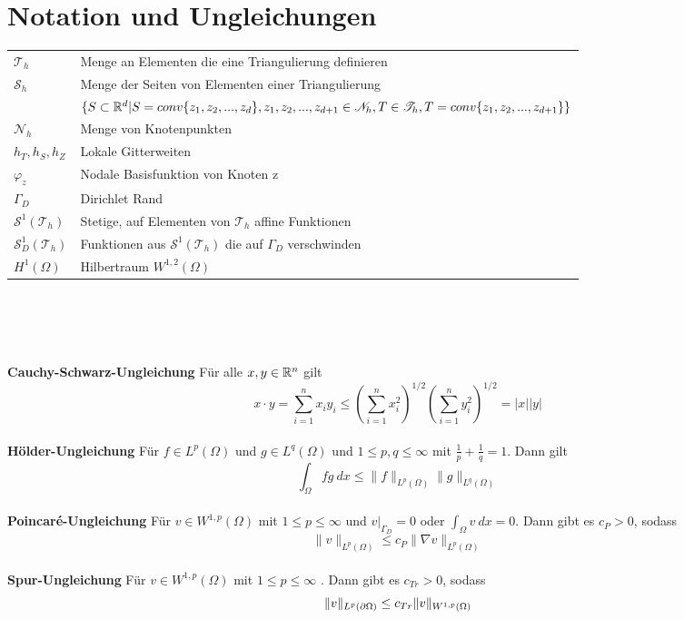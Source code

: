 \appendix
\chapter{Notation und Ungleichungen}
\begin{tabular}{l l}
	$\mathscr{T}_h$&Menge an Elementen die eine Triangulierung definieren\\
	$\mathscr{S}_h$&Menge der Seiten von Elementen einer Triangulierung\\
	& $\{S\subset\mathbb{R}^d|S= conv\{z_1,z_2,...,z_d\},z_1,z_2,...,z_{d+1}\in\mathscr{N}_h, T\in\mathscr{T}_h, T= conv\{z_1,z_2,...,z_{d+1}\}\}$\\
	$\mathscr{N}_h$&Menge von Knotenpunkten\\
	$h_T,h_S,h_Z$&Lokale Gitterweiten\\
	$\varphi_z$&Nodale Basisfunktion von Knoten z\\
	$\Gamma_D$&Dirichlet Rand\\
	$\mathscr{S}^1(\mathscr{T}_h)$&Stetige, auf Elementen von $\mathscr{T}_h$ affine Funktionen\\
	$\mathscr{S}^1_D(\mathscr{T}_h)$&Funktionen aus $\mathscr{S}^1(\mathscr{T}_h)$ die auf $\Gamma_D$ verschwinden\\
	$H^1(\Omega)$ &Hilbertraum $W^{1,2}(\Omega)$\\
\end{tabular}
\\  \\ \\ \\
\textbf{Cauchy-Schwarz-Ungleichung}
Für alle $x,y\in\mathbb{R}^n$ gilt
\[
x\cdot y =\sum_{i=1}^{n} x_iy_i\leq\left(\sum_{i=1}^{n}x_i^2\right)^{1/2}\left(\sum_{i=1}^{n}y_i^2\right)^{1/2} =|x||y|
\]\\
\textbf{Hölder-Ungleichung}
Für $f\in L^p(\Omega)$ und $g\in L^q(\Omega)$ und $1\leq p, q\leq \infty$ mit $\frac{1}{p}+\frac{1}{q}=1$. Dann gilt
\[
\int_{\Omega} fg\:dx\leq \|f\|_{L^p(\Omega)} \|g\|_{L^q(\Omega)}
\]\\
\textbf{Poincaré-Ungleichung}
Für $v\in W^{1,p}(\Omega)$ mit $1\leq p \leq \infty$ und $v|_{\Gamma_D}=0$ oder $\int_{\Omega}v\:dx =0$. Dann gibt es $c_P>0$, sodass
\[
\|v\|_{L^p(\Omega)} \leq c_P\|\nabla v\|_{L^p(\Omega)}
\]\\

\textbf{Spur-Ungleichung}
Für $v\in W^{1,p}(\Omega)$ mit $1\leq p \leq \infty$ . Dann gibt es $c_{Tr}>0$, sodass
\[
\|v\|_{L^p(\partial \Omega)} \leq c_{Tr}\|v\|_{W^{1,p}(\Omega)}
\]